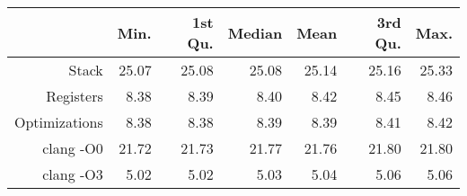 \begin{table}[ht]
\centering
\begin{tabular}{rrrrrrr}
  \hline
 & Min. & 1st Qu. & Median & Mean & 3rd Qu. & Max. \\ 
  \hline
Stack & 25.07 & 25.08 & 25.08 & 25.14 & 25.16 & 25.33 \\ 
  Registers & 8.38 & 8.39 & 8.40 & 8.42 & 8.45 & 8.46 \\ 
  Optimizations & 8.38 & 8.38 & 8.39 & 8.39 & 8.41 & 8.42 \\ 
  clang -O0 & 21.72 & 21.73 & 21.77 & 21.76 & 21.80 & 21.80 \\ 
  clang -O3 & 5.02 & 5.02 & 5.03 & 5.04 & 5.06 & 5.06 \\ 
   \hline
\end{tabular}
\end{table}
